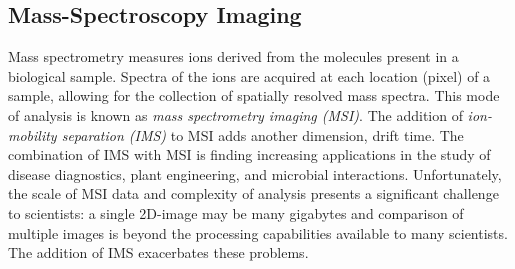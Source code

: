 


\subsection{Mass-Spectroscopy Imaging}
Mass spectrometry measures ions derived from the molecules present in a biological sample. Spectra of the ions are acquired at each location (pixel) of a sample, allowing for the collection of spatially resolved mass spectra. This mode of analysis is known as \textit{mass spectrometry imaging (MSI)}. The addition of \textit{ion-mobility separation (IMS)} to MSI adds another dimension, drift time.  The combination of IMS with MSI is finding increasing applications in the study of disease diagnostics, plant engineering, and microbial interactions. Unfortunately, the scale of MSI data and complexity of analysis presents a significant challenge to scientists: a single 2D-image may be many gigabytes and comparison of multiple images is beyond the processing capabilities available to many scientists. The addition of IMS exacerbates these problems. 

